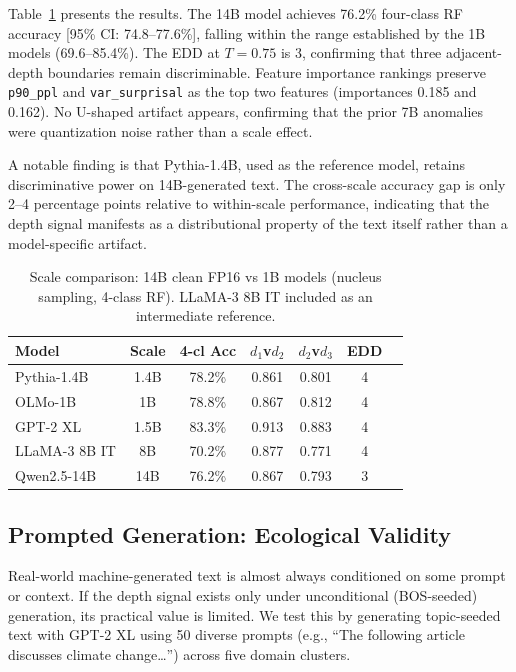 \documentclass[11pt,a4paper]{article}
\newcommand{\edd}{\textsc{EDD}}
\begin{document}
Table~\ref{tab:scale} presents the results. The 14B model achieves 76.2\% four-class RF accuracy [95\% CI: 74.8--77.6\%], falling within the range established by the 1B models (69.6--85.4\%). The \edd{} at $T = 0.75$ is 3, confirming that three adjacent-depth boundaries remain discriminable. Feature importance rankings preserve \texttt{p90\_ppl} and \texttt{var\_surprisal} as the top two features (importances 0.185 and 0.162). No U-shaped artifact appears, confirming that the prior 7B anomalies were quantization noise rather than a scale effect.

A notable finding is that Pythia-1.4B, used as the reference model, retains discriminative power on 14B-generated text. The cross-scale accuracy gap is only 2--4 percentage points relative to within-scale performance, indicating that the depth signal manifests as a distributional property of the text itself rather than a model-specific artifact.

\begin{table}[t]
\centering
\caption{Scale comparison: 14B clean FP16 vs 1B models (nucleus sampling, 4-class RF). LLaMA-3 8B IT included as an intermediate reference.}
\label{tab:scale}
\small
\begin{tabular}{lcccccc}
\toprule
\textbf{Model} & \textbf{Scale} & \textbf{4-cl Acc} & \textbf{$d_1$v$d_2$} & \textbf{$d_2$v$d_3$} & \textbf{\edd} \\
\midrule
Pythia-1.4B & 1.4B & 78.2\% & 0.861 & 0.801 & 4 \\
OLMo-1B & 1B & 78.8\% & 0.867 & 0.812 & 4 \\
GPT-2 XL & 1.5B & 83.3\% & 0.913 & 0.883 & 4 \\
LLaMA-3 8B IT & 8B & 70.2\% & 0.877 & 0.771 & 4 \\
Qwen2.5-14B & 14B & 76.2\% & 0.867 & 0.793 & 3 \\
\bottomrule
\end{tabular}
\end{table}

\subsection{Prompted Generation: Ecological Validity}
\label{sec:prompted}

Real-world machine-generated text is almost always conditioned on some prompt or context. If the depth signal exists only under unconditional (BOS-seeded) generation, its practical value is limited. We test this by generating topic-seeded text with GPT-2 XL using 50 diverse prompts (e.g., ``The following article discusses climate change\ldots'') across five domain clusters.
\end{document}
